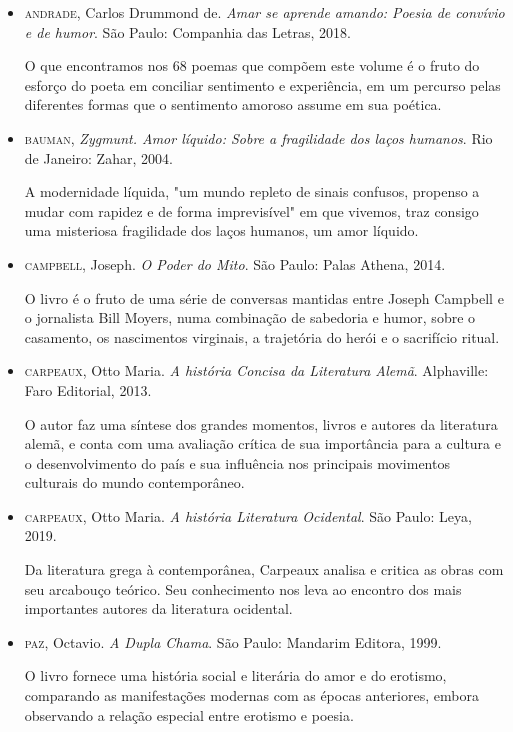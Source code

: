\documentclass[11pt]{extarticle}
\begin{document}
\begin{itemize}

\item\textsc{andrade}, Carlos Drummond de. \textit{Amar se aprende amando: Poesia de
convívio e de humor}. São Paulo: Companhia das Letras, 2018.

O que encontramos nos 68 poemas que compõem este volume é o fruto do
esforço do poeta em conciliar sentimento e experiência, em um percurso
pelas diferentes formas que o sentimento amoroso assume em sua poética.

\item\textsc{bauman,} \textit{Zygmunt. Amor líquido: Sobre a fragilidade dos
laços humanos}. Rio de Janeiro: Zahar, 2004.

A modernidade líquida, "um mundo repleto de sinais confusos, propenso a
mudar com rapidez e de forma imprevisível" em que vivemos, traz consigo
uma misteriosa fragilidade dos laços humanos, um amor líquido.

\item\textsc{campbell}, Joseph. \textit{O Poder do Mito}. São Paulo: Palas Athena,
2014.

O livro é o fruto de uma série de conversas mantidas entre Joseph
Campbell e o jornalista Bill Moyers, numa combinação de sabedoria e
humor, sobre o casamento, os nascimentos virginais, a trajetória do
herói e o sacrifício ritual.

\item\textsc{carpeaux}, Otto Maria. \textit{A história Concisa da Literatura Alemã}.
Alphaville: Faro Editorial, 2013.

O autor faz uma síntese dos grandes momentos, livros e autores da
literatura alemã, e conta com uma avaliação crítica de sua importância
para a cultura e o desenvolvimento do país e sua influência nos
principais movimentos culturais do mundo contemporâneo.

\item\textsc{carpeaux}, Otto Maria. \textit{A história Literatura Ocidental}. São
Paulo: Leya, 2019.

Da literatura grega à contemporânea, Carpeaux analisa e critica as obras
com seu arcabouço teórico. Seu conhecimento nos leva ao encontro dos
mais importantes autores da literatura ocidental.

\item\textsc{paz}, Octavio. \textit{A Dupla Chama}. São Paulo: Mandarim Editora, 1999.

O livro fornece uma história social e literária do amor e do erotismo,
comparando as manifestações modernas com as épocas anteriores, embora
observando a relação especial entre erotismo e poesia.


\end{itemize}
\end{document}
